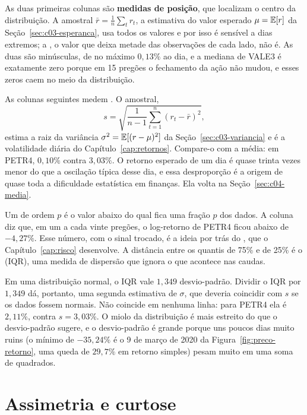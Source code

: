 As duas primeiras colunas são \textbf{medidas de posição}, que localizam o centro da distribuição. A  amostral $\bar r = \frac{1}{n}\sum_t r_t$, a estimativa do valor esperado $\mu = \operatorname{\mathbb{E}}[r]$ da Seção~\ref{sec:c03-esperanca}, usa todos os valores e por isso é sensível a dias extremos; a , o valor que deixa metade das observações de cada lado, não é. As duas são minúsculas, de no máximo $0,13\%$ ao dia, e a mediana de VALE3 é exatamente zero porque em 15 pregões o fechamento da ação não mudou, e esses zeros caem no meio da distribuição.

As colunas seguintes medem . O  amostral,
\begin{equation}
  s = \sqrt{\frac{1}{n-1}\sum_{t=1}^{n} (r_t - \bar r)^2} ,
  \label{eq:c04-desvio}
\end{equation}
estima a raiz da variância $\sigma^2 = \operatorname{\mathbb{E}}[(r - \mu)^2]$ da Seção~\ref{sec:c03-variancia} e é a volatilidade diária do Capítulo~\ref{cap:retornos}. Compare-o com a média: em PETR4, $0,10\%$ contra $3,03\%$. O retorno esperado de um dia é quase trinta vezes menor do que a oscilação típica desse dia, e essa desproporção é a origem de quase toda a dificuldade estatística em finanças. Ela volta na Seção~\ref{sec:c04-media}.

Um  de ordem $p$ é o valor abaixo do qual fica uma fração $p$ dos dados. A coluna  diz que, em um a cada vinte pregões, o log-retorno de PETR4 ficou abaixo de $-4,27\%$. Esse número, com o sinal trocado, é a ideia por trás do , que o Capítulo~\ref{cap:risco} desenvolve. A distância entre os quantis de 75\% e de 25\% é o  (IQR), uma medida de dispersão que ignora o que acontece nas caudas.

Em uma distribuição normal, o IQR vale $1,349$ desvio-padrão. Dividir o IQR por $1,349$ dá, portanto, uma segunda estimativa de $\sigma$, que deveria coincidir com $s$ se os dados fossem normais. Não coincide em nenhuma linha: para PETR4 ela é $2,11\%$, contra $s = 3,03\%$. O miolo da distribuição é mais estreito do que o desvio-padrão sugere, e o desvio-padrão é grande porque uns poucos dias muito ruins (o mínimo de $-35,24\%$ é o 9 de março de 2020 da Figura~\ref{fig:preco-retorno}, uma queda de $29,7\%$ em retorno simples) pesam muito em uma soma de quadrados.

\section{Assimetria e curtose}
\label{sec:c04-momentos}

